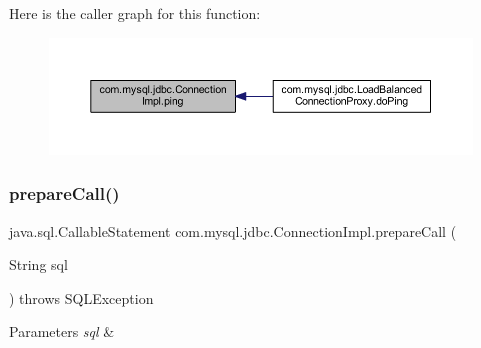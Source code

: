 Here is the caller graph for this function\+:\nopagebreak
\begin{figure}[H]
\begin{center}
\leavevmode
\includegraphics[width=350pt]{classcom_1_1mysql_1_1jdbc_1_1_connection_impl_a8a8888884eb200c850f66c3708afad14_icgraph}
\end{center}
\end{figure}
\mbox{\label{classcom_1_1mysql_1_1jdbc_1_1_connection_impl_a1c125cde555184e9117a49cf140184e4}} 
\subsubsection{\texorpdfstring{prepare\+Call()}{prepareCall()}\hspace{0.1cm}{\footnotesize\ttfamily [1/3]}}
{\footnotesize\ttfamily java.\+sql.\+Callable\+Statement com.\+mysql.\+jdbc.\+Connection\+Impl.\+prepare\+Call (\begin{DoxyParamCaption}\item[{String}]{sql }\end{DoxyParamCaption}) throws S\+Q\+L\+Exception}


\begin{DoxyParams}{Parameters}
{\em sql} & \\
\hline
\end{DoxyParams}

